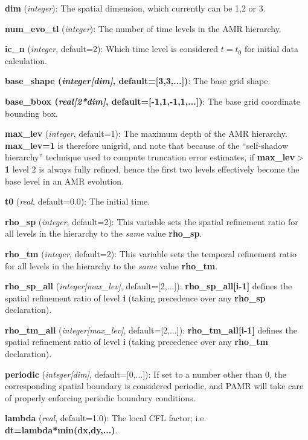 \documentclass[aps,amssymb,unsortedaddress,nofootinbib]{revtex4}
\def\lsep{\itemsep 0.05in}
\begin{document}
\begin{list}{}{\lsep}
\item {\bf dim} ({\em integer}): 
      The spatial dimension, which currently can be 1,2 or 3.
\item {\bf num\_evo\_tl} ({\em integer}): 
      The number of time levels in the AMR hierarchy.
\item {\bf ic\_n} ({\em integer}, default=2):
      Which time level is considered $t=t_0$ for initial data calculation.
\item {\bf base\_shape ({\em integer[dim]}, default=[3,3,...])}:
      The base grid shape.
\item {\bf base\_bbox ({\em real[2*dim]}, default=[-1,1,-1,1,...])}:
      The base grid coordinate bounding box.
\item {\bf max\_lev} ({\em integer}, default=1):
      The maximum depth of the AMR hierarchy. {\bf max\_lev=1} is therefore
      unigrid, and note that because of the ``self-shadow hierarchy'' 
      technique used to compute truncation error estimates, if {\bf max\_lev$>$1}
      level 2 is always fully refined, hence the first two levels effectively
      become the base level in an AMR evolution.
\item {\bf t0} ({\em real}, default=0.0):
      The initial time.
\item {\bf rho\_sp} ({\em integer}, default=2):
      This variable sets the spatial refinement ratio for all levels in the hierarchy
      to the {\em same} value {\bf rho\_sp}.
\item {\bf rho\_tm} ({\em integer}, default=2):
      This variable sets the temporal refinement ratio for all levels in the hierarchy
      to the {\em same} value {\bf rho\_tm}.
\item {\bf rho\_sp\_all} ({\em integer[max\_lev]}, default=[2,...]):
      {\bf rho\_sp\_all[i-1]} defines the spatial refinement ratio of level {\bf i}
      (taking precedence over any {\bf rho\_sp} declaration).
\item {\bf rho\_tm\_all} ({\em integer[max\_lev]}, default=[2,...]):
      {\bf rho\_tm\_all[i-1]} defines the spatial refinement ratio of level {\bf i}
      (taking precedence over any {\bf rho\_tm} declaration).
\item {\bf periodic} ({\em integer[dim]}, default=[0,...]):
      If set to a number other than 0, the corresponding spatial boundary is considered periodic,
      and PAMR will take care of properly enforcing periodic boundary conditions.
\item {\bf lambda} ({\em real}, default=1.0):
      The local CFL factor; i.e. {\bf dt=lambda*min(dx,dy,...)}.
\end{list}
\end{document}
